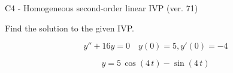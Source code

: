 \begin{exercise}
  \begin{exerciseTitle}C4 - Homogeneous second-order linear IVP (ver. 71)\end{exerciseTitle}
  \begin{exerciseStatement}
    
Find the solution to the given IVP.

    
\[y''+16y = 0 \hspace{1em} y(0) = 5 , y'(0) = -4\]

  \end{exerciseStatement}
  \begin{exerciseAnswer}
    
\[y= 5 \, \cos\left(4 \, t\right) - \sin\left(4 \, t\right)\]

  \end{exerciseAnswer}
\end{exercise}